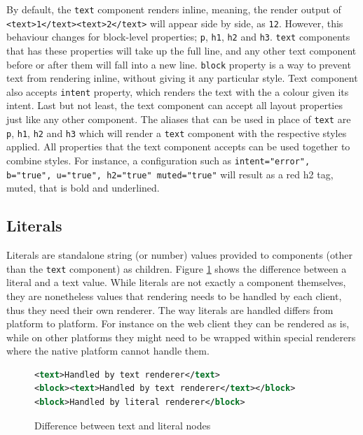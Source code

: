 By default, the \texttt{text} component renders inline, meaning, the render output of \texttt{<text>1</text><text>2</text>} will appear side by side, as \texttt{12}. However, this behaviour changes for block-level properties; \texttt{p}, \texttt{h1}, \texttt{h2} and \texttt{h3}. \texttt{text} components that has these properties will take up the full line, and any other text component before or after them will fall into a new line. \texttt{block} property is a way to prevent text from rendering inline, without giving it any particular style. Text component also accepts \texttt{intent} property, which renders the text with the a colour given its intent. Last but not least, the text component can accept all layout properties just like any other component. The aliases that can be used in place of \texttt{text} are \texttt{p}, \texttt{h1}, \texttt{h2} and \texttt{h3} which will render a \texttt{text} component with the respective styles applied. All properties that the text component accepts can be used together to combine styles. For instance, a configuration such as \texttt{intent="error", b="true", u="true", h2="true" muted="true"} will result as a red h2 tag, muted, that is bold and underlined.

\subsection{Literals}

Literals are standalone string (or number) values provided to components (other than the \texttt{text} component) as children. Figure \ref{fig:text_vs_literal} shows the difference between a literal and a text value. While literals are not exactly a component themselves, they are nonetheless values that rendering needs to be handled by each client, thus they need their own renderer. The way literals are handled differs from platform to platform. For instance on the web client they can be rendered as is, while on other platforms they might need to be wrapped within special renderers where the native platform cannot handle them.

\begin{figure}
\begin{minipage}{\linewidth}
\begin{lstlisting}[language=xml]
<text>Handled by text renderer</text>
<block><text>Handled by text renderer</text></block>
<block>Handled by literal renderer</block>
\end{lstlisting}
\end{minipage}
\caption{Difference between text and literal nodes}%
\label{fig:text_vs_literal}%
\end{figure}


